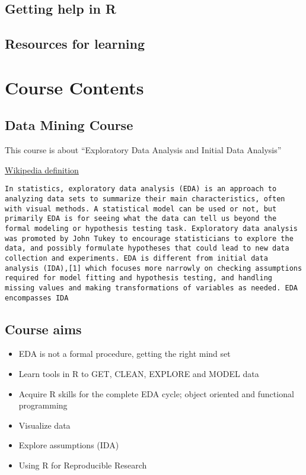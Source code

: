 \documentclass[]{book}
\providecommand{\tightlist}{%
  \setlength{\itemsep}{0pt}\setlength{\parskip}{0pt}}
\begin{document}
\hypertarget{getting-help-in-r}{%
\section{Getting help in R}\label{getting-help-in-r}}

\hypertarget{resources-for-learning}{%
\section{Resources for learning}\label{resources-for-learning}}

\hypertarget{course-contents}{%
\chapter{Course Contents}\label{course-contents}}

\hypertarget{data-mining-course}{%
\section{Data Mining Course}\label{data-mining-course}}

This course is about ``Exploratory Data Analysis and Initial Data Analysis''

\href{https://en.wikipedia.org/wiki/Exploratory_data_analysis}{Wikipedia definition}

\begin{verbatim}
In statistics, exploratory data analysis (EDA) is an approach to analyzing data sets to summarize their main characteristics, often with visual methods. A statistical model can be used or not, but primarily EDA is for seeing what the data can tell us beyond the formal modeling or hypothesis testing task. Exploratory data analysis was promoted by John Tukey to encourage statisticians to explore the data, and possibly formulate hypotheses that could lead to new data collection and experiments. EDA is different from initial data analysis (IDA),[1] which focuses more narrowly on checking assumptions required for model fitting and hypothesis testing, and handling missing values and making transformations of variables as needed. EDA encompasses IDA
\end{verbatim}

\hypertarget{course-aims}{%
\section{Course aims}\label{course-aims}}

\begin{itemize}
\tightlist
\item
  EDA is not a formal procedure, getting the right mind set
\item
  Learn tools in R to GET, CLEAN, EXPLORE and MODEL data
\item
  Acquire R skills for the complete EDA cycle; object oriented and functional programming\\
\item
  Visualize data
\item
  Explore assumptions (IDA)
\item
  Using R for Reproducible Research
\end{itemize}
\end{document}
